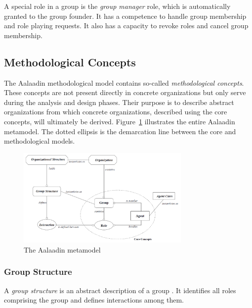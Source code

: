 A special role in a group is the \textit{group manager} role, which is automatically granted to the group founder.
It has a competence to handle group membership and role playing requests.
It also has a capacity to revoke roles and cancel group membership.

\subsection{Methodological Concepts}

The Aalaadin methodological model contains so-called \textit{methodological concepts}.
These concepts are not present directly in concrete organizations but only serve during the analysis and design phases.
Their purpose is to describe abstract organizations from which concrete organizations, described using the core concepts, will ultimately be derived.
Figure~\ref{figure:aalaadin-metamodel} illustrates the entire Aalaadin metamodel. The dotted ellipsis is the demarcation line between the core and methodological models.

\begin{figure}[h]
	\centering
	\includegraphics[width=0.75\textwidth]{images/aalaadin/aalaadin-metamodel.png}
	\caption{The Aalaadin metamodel}
	\label{figure:aalaadin-metamodel}
\end{figure}

\subsubsection*{Group Structure}

A \textit{group structure} is an abstract description of a group \cite{Ferber97}.
It identifies all roles comprising the group and defines interactions among them.

